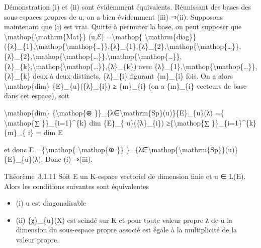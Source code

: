 \documentclass[]{article}
\begin{document}
Démonstration (i) et (ii) sont évidemment équivalents. Réunissant des
bases des sous-espaces propres de u, on a bien évidemment (iii) ⇒(ii).
Supposons maintenant que (i) est vrai. Quitte à permuter la base, on
peut supposer que
\textbackslash{}mathop\{\textbackslash{}mathrm\{Mat\}\} (u,ℰ)
=\textbackslash{}mathop\{
\textbackslash{}mathrm\{diag\}\}(\{λ\}\_\{1\},\textbackslash{}mathop\{\textbackslash{}mathop\{\ldots{}\}\},\{λ\}\_\{1\},\{λ\}\_\{2\},\textbackslash{}mathop\{\textbackslash{}mathop\{\ldots{}\}\},\{λ\}\_\{2\},\textbackslash{}mathop\{\textbackslash{}mathop\{\ldots{}\}\},\textbackslash{}mathop\{\textbackslash{}mathop\{\ldots{}\}\},\{λ\}\_\{k\},\textbackslash{}mathop\{\textbackslash{}mathop\{\ldots{}\}\},\{λ\}\_\{k\})
avec
\{λ\}\_\{1\},\textbackslash{}mathop\{\textbackslash{}mathop\{\ldots{}\}\},\{λ\}\_\{k\}
deux à deux distincts, \{λ\}\_\{i\} figurant \{m\}\_\{i\} fois. On a
alors \textbackslash{}mathop\{dim\} \{E\}\_\{u\}(\{λ\}\_\{i\}) ≥
\{m\}\_\{i\} (on a \{m\}\_\{i\} vecteurs de base dans cet espace), soit

\textbackslash{}mathop\{dim\} \{\textbackslash{}mathop\{⊕
\}\}\_\{λ∈\textbackslash{}mathrm\{Sp\}(u)\}\{E\}\_\{u\}(λ) =\{
\textbackslash{}mathop\{∑ \}\}\_\{i=1\}\^{}\{k\} dim \{E\}\_\{
u\}(\{λ\}\_\{i\}) ≥\{\textbackslash{}mathop\{∑
\}\}\_\{i=1\}\^{}\{k\}\{m\}\_\{ i\} = dim E

et donc E =\{\textbackslash{}mathop\{ \textbackslash{}mathop\{⊕ \}\}
\}\_\{λ∈\textbackslash{}mathop\{\textbackslash{}mathrm\{Sp\}\}(u)\}\{E\}\_\{u\}(λ).
Donc (i) ⇒(iii).

Théorème~3.1.11 Soit E un K-espace vectoriel de dimension finie et u ∈
L(E). Alors les conditions suivantes sont équivalentes

\begin{itemize}
\itemsep1pt\parskip0pt
\item
  (i) u est diagonalisable
\item
  (ii) \{χ\}\_\{u\}(X) est scindé sur K et pour toute valeur propre λ de
  u la dimension du sous-espace propre associé est égale à la
  multiplicité de la valeur propre.
\end{itemize}
\end{document}
